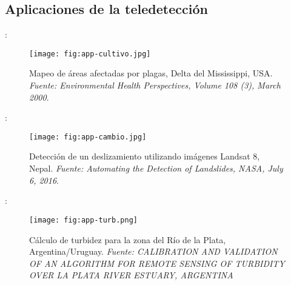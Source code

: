 
\subsection{Aplicaciones de la teledetección}

\begin{frame}{\secname : \subsecname}
  \begin{figure}
    \centering
    \texttt{[image: fig:app-cultivo.jpg]}
    \caption{Mapeo de áreas afectadas por plagas, Delta del Mississippi, USA. \emph{Fuente: Environmental Health Perspectives, Volume 108 (3), March 2000}.}
    \label{}
  \end{figure}
\end{frame}

\begin{frame}{\secname : \subsecname}
  \begin{figure}
    \centering
    \texttt{[image: fig:app-cambio.jpg]}
    \caption{Detección de un deslizamiento utilizando imágenes Landsat 8, Nepal. \emph{Fuente: Automating the Detection of Landslides, NASA, July 6, 2016}.}
    \label{}
  \end{figure}
\end{frame}

\begin{frame}{\secname : \subsecname}
  \begin{figure}
    \centering
    \texttt{[image: fig:app-turb.png]}
    \caption{Cálculo de turbidez para la zona del Río de la Plata, Argentina/Uruguay. \emph{Fuente: CALIBRATION AND VALIDATION OF AN ALGORITHM FOR REMOTE SENSING OF TURBIDITY OVER LA PLATA RIVER ESTUARY, ARGENTINA}}
    \label{}
  \end{figure}
\end{frame}

